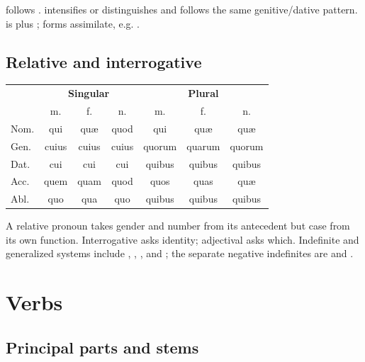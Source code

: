  follows . 
intensifies or distinguishes and follows the same genitive/dative pattern.
 is  plus ; forms assimilate,
e.g. .

\section{Relative and interrogative}

\begin{center}\small
\begin{tabular}{@{}lccc|ccc@{}}
  \toprule & \multicolumn{3}{c|}{\textbf{Singular}} &
  \multicolumn{3}{c}{\textbf{Plural}} \\
  & m. & f. & n. & m. & f. & n. \\
  \midrule
  Nom. & qui & quæ & quod & qui & quæ & quæ \\
  Gen. & cuius & cuius & cuius & quorum & quarum & quorum \\
  Dat. & cui & cui & cui & quibus & quibus & quibus \\
  Acc. & quem & quam & quod & quos & quas & quæ \\
  Abl. & quo & qua & quo & quibus & quibus & quibus \\
  \bottomrule
\end{tabular}
\end{center}

A relative pronoun takes gender and number from its antecedent but case from
its own function. Interrogative  asks identity; adjectival
 asks which. Indefinite and generalized systems include
, , , and ; the
separate negative indefinites are  and .

\chapter{Verbs}


\section{Principal parts and stems}

